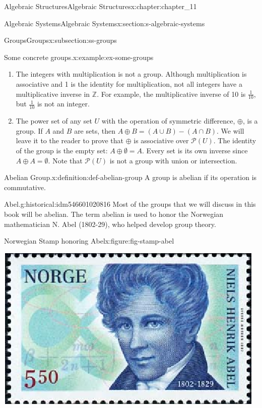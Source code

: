 \documentclass[oneside,10pt,]{book}
\numberwithin{equation}{section}
\begin{document}
\begin{chapterptx}{Algebraic Structures}{}{Algebraic Structures}{}{}{x:chapter:chapter_11}
\begin{sectionptx}{Algebraic Systems}{}{Algebraic Systems}{}{}{x:section:s-algebraic-systems}
\begin{subsectionptx}{Groups}{}{Groups}{}{}{x:subsection:ss-groups}
\begin{example}{Some concrete groups.}{x:example:ex-some-groups}
\begin{enumerate}[label=(\alph*)]
\item{}The integers with multiplication is not a group. Although multiplication is associative and 1 is the identity for multiplication, not all integers have a multiplicative inverse in \(\mathbb{Z}\).  For example, the multiplicative inverse of 10 is \(\frac{1}{10}\), but \(\frac{1}{10}\) is not an integer.%
\item{}The power set of any set \(U\) with the operation of symmetric difference, \(\oplus\), is a group. If \(A\) and \(B\) are sets, then \(A\oplus B=(A\cup B)-(A\cap B)\). We will leave it to the reader to prove that \(\oplus\) is associative over \(\mathcal{P}(U)\). The identity of the group is the empty set: \(A\oplus  \emptyset  = A\). Every set is its own inverse since \(A \oplus  A = \emptyset\). Note that \(\mathcal{P}(U)\) is not a group with union or intersection.%
\end{enumerate}
%
\end{example}
\begin{definition}{Abelian Group.}{x:definition:def-abelian-group}%
%
A group is abelian if its operation is commutative.%
\end{definition}
\begin{historical}{Abel.}{g:historical:idm546601020816}%
Most of the groups that we will discuss in this book will be abelian. The term abelian is used to honor the Norwegian mathematician N. Abel (1802-29), who helped develop group theory.%
\end{historical}
\begin{figureptx}{Norwegian Stamp honoring Abel}{x:figure:fig-stamp-abel}{}%
\begin{image}{0.2}{0.6}{0.2}%
\includegraphics[width=\linewidth]{images/fig-stamp-abel.png}
\end{image}%

\end{figureptx}
\end{subsectionptx}
\end{sectionptx}
\end{chapterptx}
\end{document}
